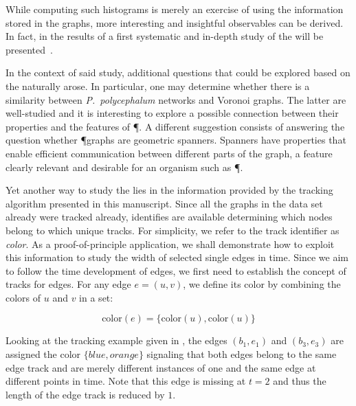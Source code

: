 	While computing such histograms is merely an exercise of using the information stored in the graphs, more interesting and insightful observables can be derived. In fact, in  the results of a first systematic and in-depth study of the \data will be presented~\cite{dirnberger2016}.

	In the context of said study, additional questions that could be explored based on the \data naturally arose. In particular, one may determine whether there is a similarity between \emph{P.~polycephalum} networks and Voronoi graphs. The latter are well-studied and it is interesting to explore a possible connection between their properties and the features of \P. A different suggestion consists of answering the question whether \P graphs are geometric spanners. Spanners have properties that enable efficient communication between different parts of the graph, a feature clearly relevant and desirable for an organism such as \P.

	Yet another way to study the \data lies in the information provided by the tracking algorithm presented in this manuscript.	Since all the graphs in the data set already were tracked already, identifies are available determining which nodes belong to which unique tracks. For simplicity, we refer to the track identifier as \emph{color}. As a proof-of-principle application, we shall demonstrate how to exploit this information to study the width of selected single edges in time. Since we aim to follow the time development of edges, we first need to establish the concept of tracks for edges. For any edge $e = (u,v)$, we define its color by combining the colors of $u$ and $v$ in a set:

	\begin{equation}
		\text{color}(e) = \{\text{color}(u), \text{color}(u)\}
	\end{equation}

	Looking at the tracking example given in , the edges $(b_1,e_1)$ and $(b_3,e_3)$ are assigned the color $\{blue, orange\}$ signaling that both edges belong to the same edge track and are merely different instances of one and the same edge at different points in time. Note that this edge is missing at $t=2$ and thus the length of the edge track is reduced by $1$.

